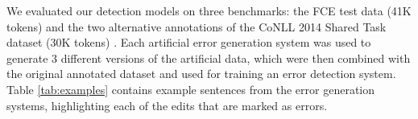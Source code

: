\documentclass[11pt,letterpaper]{article}
\begin{document}
We evaluated our detection models on three benchmarks: the FCE test data (41K tokens) and the two alternative annotations of the CoNLL 2014 Shared Task dataset (30K tokens) \cite{Ng2013a}.
Each artificial error generation system was used to generate 3 different versions of the artificial data, which were then combined with the original annotated dataset and used for training an error detection system.
Table \ref{tab:examples} contains example sentences from the error generation systems, highlighting each of the edits that are marked as errors.


\end{document}
